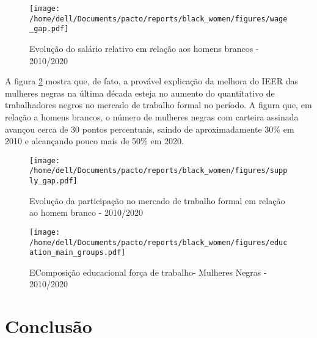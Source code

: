 \documentclass[12pt]{article}
\begin{document}
\begin{figure}[H]
    \centering
    \caption{Evolução do salário relativo em relação aos homens brancos - 2010/2020}
        \texttt{[image: /home/dell/Documents/pacto/reports/black\_women/figures/wage\_gap.pdf]}
    \label{fig:wage_gap}
\end{figure}

\par A figura \ref{fig:supply_gap} mostra que, de fato, a provável explicação da melhora do IEER das mulheres negras na última década esteja no aumento do quantitativo de trabalhadores negros no mercado de trabalho formal no período. A figura que, em relação a homens brancos, o número de mulheres negras com carteira assinada avançou cerca de 30 pontos percentuais, saindo de aproximadamente 30\% em 2010 e alcançando pouco mais de 50\% em 2020.


\begin{figure}[H]
    \centering
    \caption{Evolução da participação no mercado de trabalho formal em relação ao homem branco - 2010/2020}
        \texttt{[image: /home/dell/Documents/pacto/reports/black\_women/figures/supply\_gap.pdf]}
    \label{fig:supply_gap}
\end{figure}




\begin{figure}[H]
    \centering
    \caption{EComposição educacional força de trabalho- Mulheres Negras - 2010/2020}
        \texttt{[image: /home/dell/Documents/pacto/reports/black\_women/figures/education\_main\_groups.pdf]}
\end{figure}

\section{Conclusão}

\clearpage

\printbibliography[title={Bibliografia}, nottype=misc]
\end{document}
